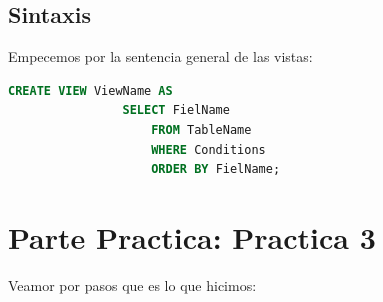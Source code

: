 \documentclass[12pt, fleqn]{article}                             %
\begin{document}
    \subsection{Sintaxis}

        Empecemos por la sentencia general de las vistas:

        \begin{lstlisting}[language=SQL, gobble=12]
            CREATE VIEW ViewName AS
                SELECT FielName
                    FROM TableName
                    WHERE Conditions
                    ORDER BY FielName; 
        \end{lstlisting}

       

\clearpage
\section{Parte Practica: Practica 3}

    Veamor por pasos que es lo que hicimos:
\end{document}
